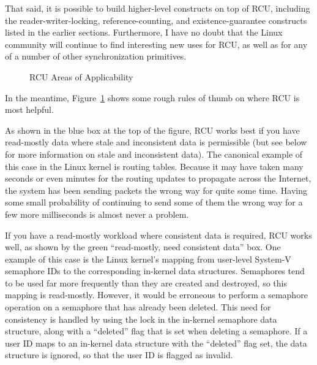 That said, it is possible to build higher-level constructs
on top of RCU, including the reader-writer-locking, reference-counting,
and existence-guarantee constructs listed in the earlier sections.
Furthermore, I have no doubt that the Linux community will continue to
find interesting new uses for RCU,
as well as for any of a number of other synchronization primitives.

\begin{figure}[tbh]
\centering
{}
\caption{RCU Areas of Applicability}
\label{fig:defer:RCU Areas of Applicability}
\end{figure}

In the meantime,
Figure~\ref{fig:defer:RCU Areas of Applicability}
shows some rough rules of thumb on where RCU is most helpful.

As shown in the blue box at the top of the figure, RCU works best if
you have read-mostly data where stale and inconsistent
data is permissible (but see below for more information on stale and
inconsistent data).
The canonical example of this case in the Linux kernel is routing tables.
Because it may have taken many seconds or even minutes for the
routing updates to propagate across the Internet, the system
has been sending packets the wrong way for quite some time.
Having some small probability of continuing to send some of them the wrong
way for a few more milliseconds is almost never a problem.

If you have a read-mostly workload where consistent data is required,
RCU works well, as shown by the green ``read-mostly, need consistent data''
box.
One example of this case is the Linux kernel's mapping from user-level
System-V semaphore IDs to the corresponding in-kernel data structures.
Semaphores tend to be used far more frequently than they are created
and destroyed, so this mapping is read-mostly.
However, it would be erroneous to perform a semaphore operation on
a semaphore that has already been deleted.
This need for consistency is handled by using the lock in the
in-kernel semaphore data structure, along with a ``deleted''
flag that is set when deleting a semaphore.
If a user ID maps to an in-kernel data structure with the
``deleted'' flag set, the data structure is ignored, so that
the user ID is flagged as invalid.

